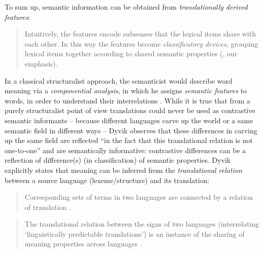 To sum up, semantic information can be obtained from \textit{translationally} \textit{derived} \textit{features}:

\begin{quote}
Intuitively, the features encode subsenses that the lexical items share with each other. In this way the features become \textit{classificatory} \textit{devices}, grouping lexical items together according to shared semantic properties (\citealt[31]{langemets_translations_2005}, our emphasis).
\end{quote}

In a classical structuralist approach, the semanticist would describe word meaning via a \textit{componential analysis}, in which he assigns \textit{semantic features} to words, in order to understand their interrelations \citep[28]{langemets_translations_2005}. While it is true that from a purely structuralist point of view translations could never be used as contrastive semantic informants – because different languages carve up the world or a same semantic field in different ways – Dyvik observes that these differences in carving up the same field are reflected “in the fact that this translational relation is not one-to-one” \citep[29]{langemets_translations_2005} and are semantically informative: contrastive differences can be a reflection of difference(s) (in classification) of semantic properties. Dyvik explicitly states that meaning can be inferred from the \textit{translational relation} between a source language (lexeme/structure) and its translation:

\begin{quote}
Corresponding sets of terms in two languages are connected by a relation of translation \citep[29]{langemets_translations_2005}.
\end{quote}

\begin{quote}
The translational relation between the signs of two languages (interrelating ‘linguistically predictable translations’) is an instance of the sharing of meaning properties across languages \citep[217]{hasselgard_complexity_1999}.
\end{quote}

